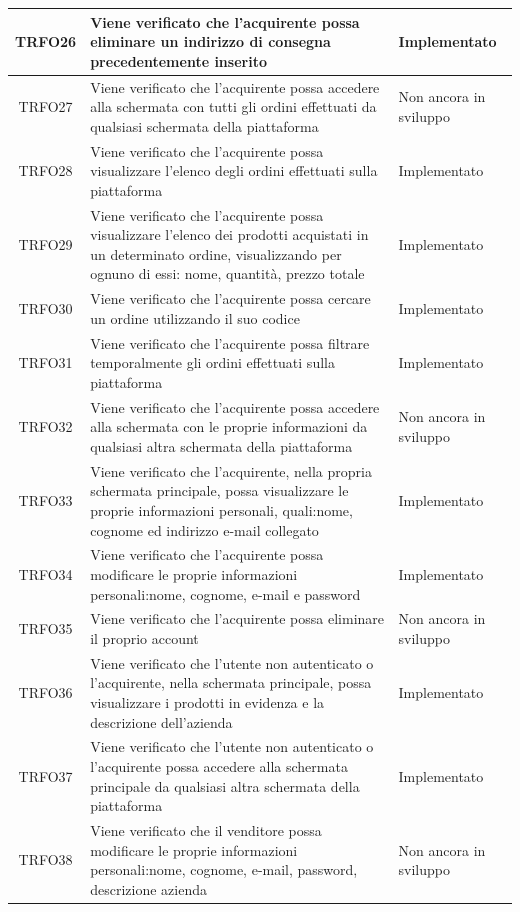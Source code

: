 \begin{longtable}{|c| C{10cm} |C{3cm}|}
	TRFO26 & Viene verificato che l'acquirente possa eliminare un indirizzo di consegna precedentemente inserito & Implementato\\ \hline
	TRFO27 & Viene verificato che l'acquirente possa accedere alla schermata con tutti gli ordini effettuati da qualsiasi schermata della piattaforma & Non ancora in sviluppo \\ \hline
	TRFO28 & Viene verificato che l'acquirente possa visualizzare l'elenco degli ordini effettuati sulla piattaforma & Implementato\\ \hline
	TRFO29 & Viene verificato che l'acquirente possa visualizzare l'elenco dei prodotti acquistati in un determinato ordine, visualizzando per ognuno di essi: nome, quantità, prezzo totale & Implementato\\ \hline
	TRFO30 & Viene verificato che l'acquirente possa cercare un ordine utilizzando il suo codice & Implementato\\ \hline
	TRFO31 & Viene verificato che l'acquirente possa filtrare temporalmente gli ordini effettuati sulla piattaforma & Implementato\\ \hline
	TRFO32 & Viene verificato che l'acquirente possa accedere alla schermata con le proprie informazioni da qualsiasi altra schermata della piattaforma & Non ancora in sviluppo\\ \hline
	TRFO33 & Viene verificato che l'acquirente, nella propria schermata principale, possa visualizzare le proprie informazioni personali, quali:nome, cognome ed indirizzo e-mail collegato & Implementato\\ \hline
	TRFO34 & Viene verificato che l'acquirente possa modificare le proprie informazioni personali:nome, cognome, e-mail e password & Implementato\\ \hline
	TRFO35 & Viene verificato che l'acquirente possa eliminare il proprio account & Non ancora in sviluppo\\ \hline
	TRFO36 & Viene verificato che l'utente non autenticato o l'acquirente, nella schermata principale, possa visualizzare i prodotti in evidenza e la descrizione dell'azienda & Implementato\\ \hline
	TRFO37 & Viene verificato che l'utente non autenticato o l'acquirente possa accedere alla schermata principale da qualsiasi altra schermata della piattaforma & Implementato\\ \hline
	TRFO38 & Viene verificato che il venditore possa modificare le proprie informazioni personali:nome, cognome, e-mail, password, descrizione azienda & Non ancora in sviluppo\\ \hline

\end{longtable}
